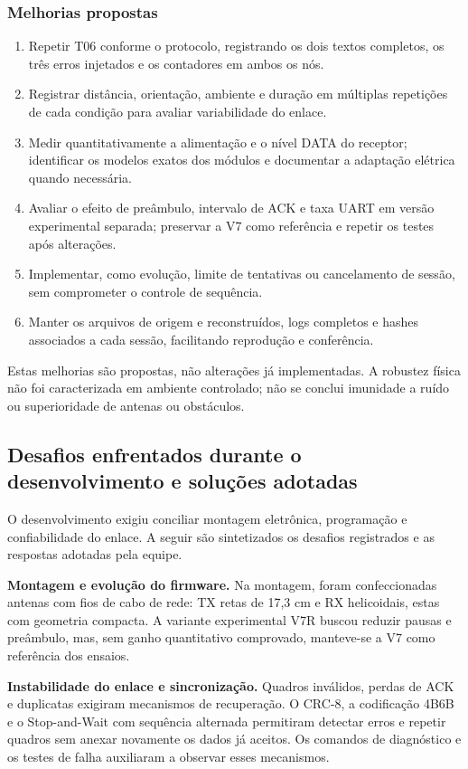 \subsubsection*{Melhorias propostas}
\begin{enumerate}
\item Repetir T06 conforme o protocolo, registrando os dois textos completos, os três erros injetados e os contadores em ambos os nós.
\item Registrar distância, orientação, ambiente e duração em múltiplas repetições de cada condição para avaliar variabilidade do enlace.
\item Medir quantitativamente a alimentação e o nível DATA do receptor; identificar os modelos exatos dos módulos e documentar a adaptação elétrica quando necessária.
\item Avaliar o efeito de preâmbulo, intervalo de ACK e taxa UART em versão experimental separada; preservar a V7 como referência e repetir os testes após alterações.
\item Implementar, como evolução, limite de tentativas ou cancelamento de sessão, sem comprometer o controle de sequência.
\item Manter os arquivos de origem e reconstruídos, logs completos e hashes associados a cada sessão, facilitando reprodução e conferência.
\end{enumerate}
Estas melhorias são propostas, não alterações já implementadas. A robustez física não foi caracterizada em ambiente controlado; não se conclui imunidade a ruído ou superioridade de antenas ou obstáculos.

\subsection{Desafios enfrentados durante o desenvolvimento e soluções adotadas}
\label{sec:desafios}
O desenvolvimento exigiu conciliar montagem eletrônica, programação e confiabilidade do enlace. A seguir são sintetizados os desafios registrados e as respostas adotadas pela equipe.

\textbf{Montagem e evolução do firmware.} Na montagem, foram confeccionadas antenas com fios de cabo de rede: TX retas de 17,3 cm e RX helicoidais, estas com geometria compacta. A variante experimental V7R buscou reduzir pausas e preâmbulo, mas, sem ganho quantitativo comprovado, manteve-se a V7 como referência dos ensaios.

\textbf{Instabilidade do enlace e sincronização.} Quadros inválidos, perdas de ACK e duplicatas exigiram mecanismos de recuperação. O CRC-8, a codificação 4B6B e o Stop-and-Wait com sequência alternada permitiram detectar erros e repetir quadros sem anexar novamente os dados já aceitos. Os comandos de diagnóstico e os testes de falha auxiliaram a observar esses mecanismos.

